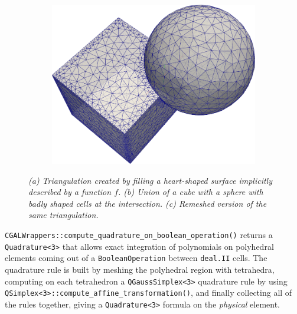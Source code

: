 \documentclass{ansarticle-preprint}
\newcommand{\specialword}[1]{\texttt{#1}}
\newcommand{\dealii}{{\specialword{deal.II}}\xspace}
\begin{document}
\begin{figure}
\begin{subfigure}[b]{0.28\textwidth}
    \caption{\label{fig:corefinement}}
  \end{subfigure}
  \hfill
  \begin{subfigure}[b]{0.35\textwidth}
    \centering
    \includegraphics[width=\textwidth]{png/cube_sphere_remeshed.png}
    \caption{ \label{fig:corefinement_remeshed}}
  \end{subfigure}
  \caption{\it (a) Triangulation created by filling a heart-shaped surface implicitly described by a function $f$. (b) Union of a cube with a sphere with badly shaped cells at the intersection. (c) Remeshed version of the same triangulation.}
\end{figure}

\texttt{CGALWrappers::compute\_quadrature\_on\_boolean\_operation()} returns a \texttt{Quadrature<3>} that allows exact integration of polynomials on polyhedral elements coming out of a \texttt{BooleanOperation} between \dealii cells.
The quadrature rule is built by meshing the polyhedral region with tetrahedra, computing on each tetrahedron a \texttt{QGaussSimplex<3>} quadrature rule by using \texttt{QSimplex<3>::\allowbreak{}compute\_affine\_transformation()}, and finally
collecting all of the rules together, giving a \texttt{Quadrature<3>} formula on the \emph{physical} element.
\end{document}
